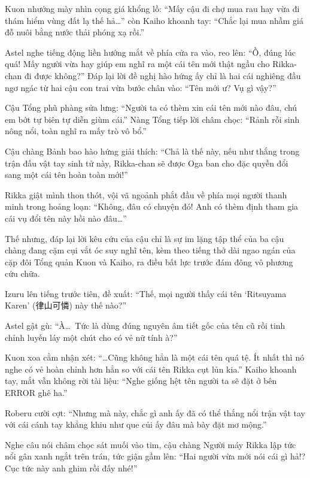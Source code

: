 \documentclass[../main.tex]{subfiles}
\begin{document}

Kuon nhướng mày nhìn cọng giá khổng lồ: ``Mấy cậu đi chợ mua rau hay vừa đi thám hiểm vùng đất lạ thế hả\dots'' còn Kaiho khoanh tay: ``Chắc lại mua nhầm giá đỗ nuôi bằng nước thải phóng xạ rồi.''

Astel nghe tiếng động liền hướng mắt về phía cửa ra vào, reo lên: ``Ồ, đúng lúc quá! Mấy người vừa hay giúp em nghĩ ra một cái tên mới thật ngầu cho Rikka-chan đi được không?'' Đáp lại lời đề nghị hào hứng ấy chỉ là hai cái nghiêng đầu ngơ ngác từ hai cậu con trai vừa bước chân vào: ``Tên mới ư? Vụ gì vậy?''

Cậu Tổng phũ phàng sửa lưng: ``Người ta có thèm xin cái tên mới nào đâu, chú em bớt tự biên tự diễn giùm cái.'' Nàng Tổng tiếp lời châm chọc: ``Rảnh rỗi sinh nông nổi, toàn nghĩ ra mấy trò vô bổ.''

Cậu chàng Bảnh bao hào hứng giải thích: ``Chả là thế này, nếu như thắng trong trận đấu vật tay sinh tử này, Rikka-chan sẽ được Oga ban cho đặc quyền đổi sang một cái tên hoàn toàn mới!''

Rikka giật mình thon thót, vội vã ngoảnh phắt đầu về phía mọi người thanh minh trong hoảng loạn: ``Không, đâu có chuyện đó! Anh có thèm định tham gia cái vụ đổi tên này hồi nào đâu\dots''

Thế nhưng, đáp lại lời kêu cứu của cậu chỉ là sự im lặng tập thể của ba cậu chàng đang cặm cụi vắt óc suy nghĩ tên, kèm theo tiếng thở dài ngao ngán của cặp đôi Tổng quản Kuon và Kaiho, ra điều bất lực trước đám đông vô phương cứu chữa.


Izuru lên tiếng trước tiên, đề xuất: ``Thế, mọi người thấy cái tên `Ritsuyama Karen' (律山可憐) này thế nào?''

Astel gật gù: ``À\dots\ Tức là dùng đúng nguyên âm tiết gốc của tên cũ rồi tinh chỉnh luyến láy một chút cho có vẻ nữ tính à?''

Kuon xoa cằm nhận xét: ``\dots Cũng không hẳn là một cái tên quá tệ. Ít nhất thì nó nghe có vẻ hoàn chỉnh hơn hẳn so với cái tên Rikka cụt lủn kia.'' Kaiho khoanh tay, mắt vẫn không rời tài liệu: ``Nghe giống hệt tên người ta sẽ đặt ở bên ERROR ghê ha.''

Roberu cười cợt: ``Nhưng mà này, chắc gì anh ấy đã có thể thắng nổi trận vật tay với cái cánh tay khẳng khiu như que củi ấy đâu mà bày đặt mơ mộng.''

Nghe câu nói châm chọc sát muối vào tim, cậu chàng Người máy Rikka lập tức nổi gân xanh ngắt trên trán, tức giận gầm lên: ``Hai người vừa mới nói cái gì hả!? Cục tức này anh ghim rồi đấy nhé!''
\end{document}

